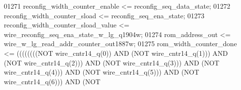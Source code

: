 \begin{DoxyCode}
{01271     \textcolor{vhdlchar}{reconfig_width_counter_enable} \textcolor{vhdlchar}{<=} \textcolor{vhdlchar}{reconfig_seq_data_state};
01272     \textcolor{vhdlchar}{reconfig_width_counter_sload} \textcolor{vhdlchar}{<=} \textcolor{vhdlchar}{reconfig_seq_ena_state};
01273     \textcolor{vhdlchar}{reconfig_width_counter_sload_value} \textcolor{vhdlchar}{<=} \textcolor{vhdlchar}{
      wire_reconfig_seq_ena_state_w_lg_q1904w};
01274     \textcolor{vhdlchar}{rom_address_out} \textcolor{vhdlchar}{<=} \textcolor{vhdlchar}{wire_w_lg_read_addr_counter_out1887w};
01275     \textcolor{vhdlchar}{rom_width_counter_done} \textcolor{vhdlchar}{<=} \textcolor{vhdlchar}{(}\textcolor{vhdlchar}{(}\textcolor{vhdlchar}{(}\textcolor{vhdlchar}{(}\textcolor{vhdlchar}{(}\textcolor{vhdlchar}{(}\textcolor{vhdlchar}{(}\textcolor{vhdlchar}{(}\textcolor{keywordflow}{NOT} \textcolor{vhdlchar}{wire_cntr14_q}\textcolor{vhdlchar}{(}\textcolor{vhdllogic}{}\textcolor{vhdllogic}{0}\textcolor{vhdlchar}{)}\textcolor{vhdlchar}{)} \textcolor{keywordflow}{AND} \textcolor{vhdlchar}{(}\textcolor{keywordflow}{NOT} \textcolor{vhdlchar}{
      wire_cntr14_q}\textcolor{vhdlchar}{(}\textcolor{vhdllogic}{}\textcolor{vhdllogic}{1}\textcolor{vhdlchar}{)}\textcolor{vhdlchar}{)}\textcolor{vhdlchar}{)} \textcolor{keywordflow}{AND} \textcolor{vhdlchar}{(}\textcolor{keywordflow}{NOT} \textcolor{vhdlchar}{wire_cntr14_q}\textcolor{vhdlchar}{(}\textcolor{vhdllogic}{}\textcolor{vhdllogic}{2}\textcolor{vhdlchar}{)}\textcolor{vhdlchar}{)}\textcolor{vhdlchar}{)} \textcolor{keywordflow}{AND} \textcolor{vhdlchar}{(}\textcolor{keywordflow}{NOT} \textcolor{vhdlchar}{wire_cntr14_q}\textcolor{vhdlchar}{(}\textcolor{vhdllogic}{}\textcolor{vhdllogic}{3}\textcolor{vhdlchar}{)}\textcolor{vhdlchar}{)}\textcolor{vhdlchar}{)} \textcolor{keywordflow}{AND} \textcolor{vhdlchar}{(}\textcolor{keywordflow}{NOT} \textcolor{vhdlchar}{
      wire_cntr14_q}\textcolor{vhdlchar}{(}\textcolor{vhdllogic}{}\textcolor{vhdllogic}{4}\textcolor{vhdlchar}{)}\textcolor{vhdlchar}{)}\textcolor{vhdlchar}{)} \textcolor{keywordflow}{AND} \textcolor{vhdlchar}{(}\textcolor{keywordflow}{NOT} \textcolor{vhdlchar}{wire_cntr14_q}\textcolor{vhdlchar}{(}\textcolor{vhdllogic}{}\textcolor{vhdllogic}{5}\textcolor{vhdlchar}{)}\textcolor{vhdlchar}{)}\textcolor{vhdlchar}{)} \textcolor{keywordflow}{AND} \textcolor{vhdlchar}{(}\textcolor{keywordflow}{NOT} \textcolor{vhdlchar}{wire_cntr14_q}\textcolor{vhdlchar}{(}\textcolor{vhdllogic}{}\textcolor{vhdllogic}{6}\textcolor{vhdlchar}{)}\textcolor{vhdlchar}{)}\textcolor{vhdlchar}{)} \textcolor{keywordflow}{AND} \textcolor{vhdlchar}{(}\textcolor{keywordflow}{NOT} \textcolor{vhdlchar}{
}}
\end{DoxyCode}
